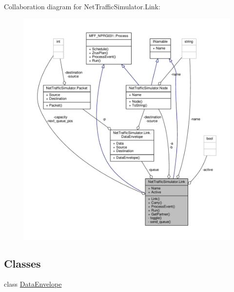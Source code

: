 Collaboration diagram for Net\-Traffic\-Simulator.\-Link\-:\nopagebreak
\begin{figure}[H]
\begin{center}
\leavevmode
\includegraphics[width=350pt]{classNetTrafficSimulator_1_1Link__coll__graph}
\end{center}
\end{figure}
\subsection*{Classes}
\begin{DoxyCompactItemize}
\item 
class \hyperlink{classNetTrafficSimulator_1_1Link_1_1DataEnvelope}{Data\-Envelope}
\end{DoxyCompactItemize}
